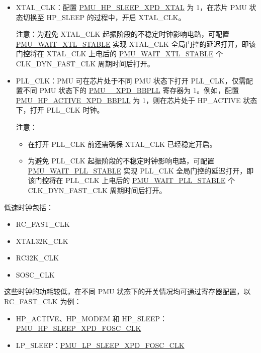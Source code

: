 \documentclass[main\_\_CN.tex]{subfiles}
\begin{document}
\begin{itemize}
    \item XTAL\_CLK：配置 \hyperref[fielddesc:PMUHPSLEEPXPDXTAL]{PMU\_HP\_SLEEP\_XPD\_XTAL} 为 1，在芯片 PMU 状态切换至 HP\_SLEEP 的过程中，开启 XTAL\_CLK。

    注意：为避免 XTAL\_CLK 起振阶段的不稳定时钟影响电路，可配置 \hyperref[fielddesc:PMUWAITXTLSTABLE]{PMU\_WAIT\_XTL\_STABLE} 实现 XTAL\_CLK 全局门控的延迟打开，即该门控将在 XTAL\_CLK 上电后的 \hyperref[fielddesc:PMUWAITXTLSTABLE]{PMU\_WAIT\_XTL\_STABLE} 个 CLK\_DYN\_FAST\_CLK 周期时间后打开。

    \item PLL\_CLK：PMU 可在芯片处于不同 PMU 状态下打开 PLL\_CLK，仅需配置不同 PMU 状态下的 \hyperref[fielddesc:PMUHPACTIVEXPDBBPLL]{PMU\_\_XPD\_BBPLL} 寄存器为 1。例如，配置 \hyperref[fielddesc:PMUHPACTIVEXPDBBPLL]{PMU\_HP\_ACTIVE\_XPD\_BBPLL} 为 1，则在芯片处于 HP\_ACTIVE 状态下，打开 PLL\_CLK 时钟。

    注意：
    \begin{itemize}
        \item 在打开 PLL\_CLK 前还需确保 XTAL\_CLK 已经稳定开启。
        \item 为避免 PLL\_CLK 起振阶段的不稳定时钟影响电路，可配置 \hyperref[fielddesc:PMUWAITPLLSTABLE]{PMU\_WAIT\_PLL\_STABLE} 实现 PLL\_CLK 全局门控的延迟打开，即该门控将在 PLL\_CLK 上电后的 \hyperref[fielddesc:PMUWAITPLLSTABLE]{PMU\_WAIT\_PLL\_STABLE} 个CLK\_DYN\_FAST\_CLK 周期时间后打开。
    \end{itemize}
\end{itemize}

低速时钟包括：
\begin{itemize}
\item RC\_FAST\_CLK
\item XTAL32K\_CLK
\item RC32K\_CLK
\item SOSC\_CLK
\end{itemize}

这些时钟的功耗较低，在不同 PMU 状态下的开关情况均可通过寄存器配置，以 RC\_FAST\_CLK 为例：

\begin{itemize}
    \item HP\_ACTIVE、HP\_MODEM 和 HP\_SLEEP：\hyperref[fielddesc:PMUHPSLEEPXPDFOSCCLK]{PMU\_HP\_SLEEP\_XPD\_FOSC\_CLK}
    \item LP\_SLEEP：\hyperref[fielddesc:PMULPSLEEPXPDFOSCCLK]{PMU\_LP\_SLEEP\_XPD\_FOSC\_CLK}
\end{itemize}
\end{document}
